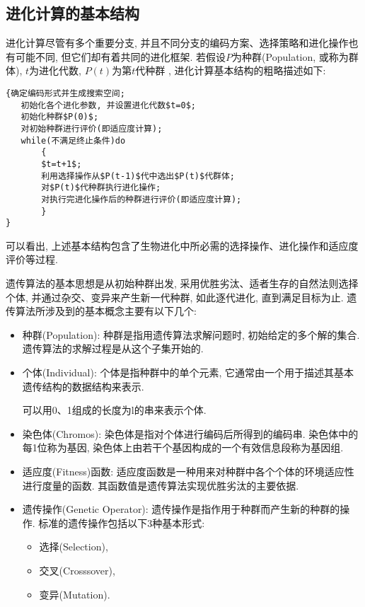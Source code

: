\subsection{进化计算的基本结构}
进化计算尽管有多个重要分支, 并且不同分支的编码方案、选择策略和进化操作也有可能不同, 但它们却有着共同的进化框架.
若假设$P$为种群(Population, 或称为群体), $t$为进化代数, $P(t)$为第$t$代种群 , 进化计算基本结构的粗略描述如下:
\begin{Verbatim}
{确定编码形式并生成搜索空间;
   初始化各个进化参数, 并设置进化代数$t=0$;
   初始化种群$P(0)$;
   对初始种群进行评价(即适应度计算);
   while(不满足终止条件)do
       {
       $t=t+1$;
       利用选择操作从$P(t-1)$代中选出$P(t)$代群体;
       对$P(t)$代种群执行进化操作;
       对执行完进化操作后的种群进行评价(即适应度计算);
       }
}
\end{Verbatim}
\begin{remark}
    可以看出, 上述基本结构包含了生物进化中所必需的选择操作、进化操作和适应度评价等过程.
\end{remark}

遗传算法的基本思想是从初始种群出发, 采用优胜劣汰、适者生存的自然法则选择个体, 并通过杂交、变异来产生新一代种群, 如此逐代进化, 直到满足目标为止.
遗传算法所涉及到的基本概念主要有以下几个:
\begin{itemize}
\item 种群(Population): 种群是指用遗传算法求解问题时, 初始给定的多个解的集合. 遗传算法的求解过程是从这个子集开始的.
\item 个体(Individual): 个体是指种群中的单个元素, 它通常由一个用于描述其基本遗传结构的数据结构来表示.
        \begin{example}
            可以用0、1组成的长度为l的串来表示个体.
        \end{example}
\item 染色体(Chromos): 染色体是指对个体进行编码后所得到的编码串. 染色体中的每1位称为基因, 染色体上由若干个基因构成的一个有效信息段称为基因组.
\item 适应度(Fitness)函数: 适应度函数是一种用来对种群中各个个体的环境适应性进行度量的函数. 其函数值是遗传算法实现优胜劣汰的主要依据.
\item 遗传操作(Genetic Operator): 遗传操作是指作用于种群而产生新的种群的操作. 标准的遗传操作包括以下3种基本形式:
\begin{itemize}
    \item 选择(Selection),
    \item 交叉(Crosssover),
    \item 变异(Mutation).
\end{itemize}
\end{itemize}

